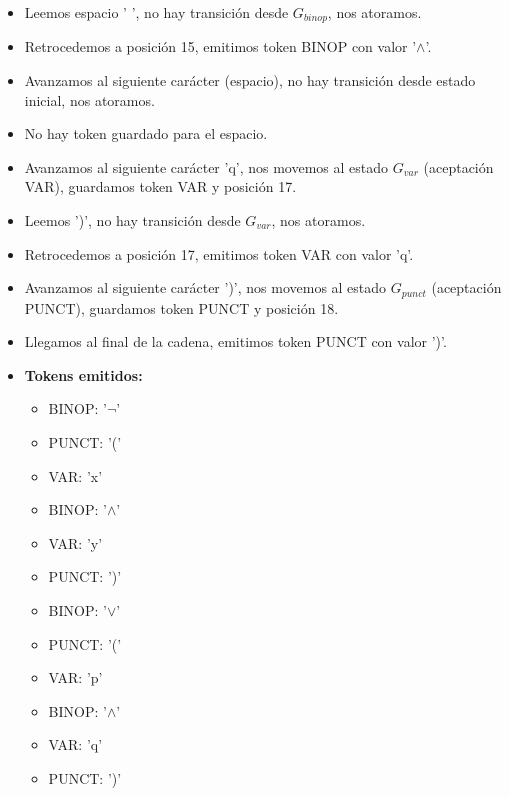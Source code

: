 \begin{enumerate}
\begin{itemize}
        \item Leemos espacio ' ', no hay transición desde $G_{binop}$, nos atoramos.
        \item Retrocedemos a posición 15, emitimos token BINOP con valor '$\land$'.
        \item Avanzamos al siguiente carácter (espacio), no hay transición desde estado inicial, nos atoramos.
        \item No hay token guardado para el espacio.
        \item Avanzamos al siguiente carácter 'q', nos movemos al estado $G_{var}$ (aceptación VAR), guardamos token VAR y posición 17.
        \item Leemos ')', no hay transición desde $G_{var}$, nos atoramos.
        \item Retrocedemos a posición 17, emitimos token VAR con valor 'q'.
        \item Avanzamos al siguiente carácter ')', nos movemos al estado $G_{punct}$ (aceptación PUNCT), guardamos token PUNCT y posición 18.
        \item Llegamos al final de la cadena, emitimos token PUNCT con valor ')'.
    \item \textbf{Tokens emitidos:}
        \begin{itemize}
            \item BINOP: '$\lnot$'
            \item PUNCT: '('
            \item VAR: 'x'
            \item BINOP: '$\land$'
            \item VAR: 'y'
            \item PUNCT: ')'
            \item BINOP: '$\lor$'
            \item PUNCT: '('
            \item VAR: 'p'
            \item BINOP: '$\land$'
            \item VAR: 'q'
            \item PUNCT: ')'
        \end{itemize}
    \end{itemize}
\end{enumerate}